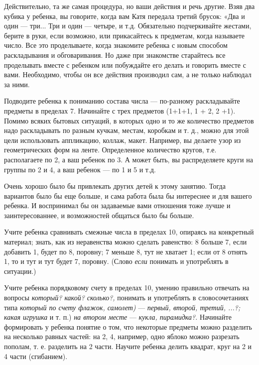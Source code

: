 \documentclass{book}
\renewcommand{\emph}[1]{\textit{#1}}
\begin{document}
Действительно, та же самая процедура, но ваши действия и речь другие.
Взяв два кубика у ребенка, вы говорите, когда вам Катя передала третий
брусок: «Два и один --- три... Три и один --- четыре, и т.д. Обязательно
подчеркивайте жестами, берите в руки, если возможно, или прикасайтесь к
предметам, когда называете число. Все это проделываете, когда знакомите
ребенка с новым способом раскладывания и обговаривания. Но даже при
знакомстве старайтесь все проделывать вместе с ребенком или побуждайте
его делать и говорить вместе с вами. Необходимо, чтобы он все действия
производил сам, а не только наблюдал за ними.

Подводите ребенка к пониманию состава числа --- по-разному раскладывайте
предметы в пределах 7. Начинайте с трех предметов (1+1+1, 1 + 2, 2 +1).
Помимо всяких бытовых ситуаций, в которых одно и то же количество
предметов надо раскладывать по разным кучкам, местам, коробкам и т. д.,
можно для этой цели использовать аппликацию, коллаж, макет. Например, вы
делаете узор из геометрических форм на ленте. Определенное количество
кругов, т.е. располагаете по 2, а ваш ребенок по 3. А может быть, вы
распределяете круги на группы по 2 и 4, а ваш ребенок --- по 1 и 5 и
т.д.

Очень хорошо было бы привлекать других детей к этому занятию. Тогда
вариантов было бы еще больше, и сама работа была бы интереснее и для
вашего ребенка. И воспринимал бы он задаваемые вами отношения тоже лучше
и заинтересованнее, и возможностей общаться было бы больше.

Учите ребенка сравнивать смежные числа в пределах 10, опираясь на
конкретный материал; знать, как из неравенства можно сделать равенство:
8 больше 7, если добавить 1, будет по 8, поровну; 7 меньше 8, тут не
хватает 1; если от 8 отнять 1, то и тут и тут будет 7, поровну. (Слово
\emph{если} понимать и употреблять в ситуации.)

Учите ребенка порядковому счету в пределах 10, умению правильно отвечать
на вопросы \emph{который? какой? сколько?,} понимать и употреблять в
словосочетаниях типа \emph{который по счету флажок, самолет)} ---
\emph{первый, второй, третий, ...?; какая игрушка} и т. п.) \emph{на
втором месте} --- \emph{кукла, пирамидка?.} Начинайте формировать у
ребенка понятие о том, что некоторые предметы можно разделить на
несколько равных частей: на 2, 4, например, одно яблоко можно разрезать
пополам, т. е. разделить на 2 части. Научите ребенка делить квадрат,
круг на 2 и 4 части (сгибанием).
\end{document}
